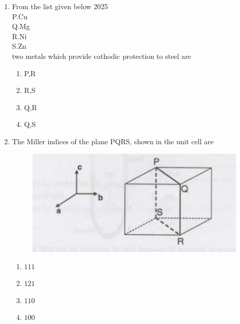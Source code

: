 \documentclass[journal]{IEEEtran}
\theoremstyle{remark}
\begin{document}
\begin{enumerate}
\begin{figure}[h]
    \label{fig:placeholder}
\end{figure}
\begin{multicols}{4}
\begin{enumerate}
    \item M1
    \item M2
    \item M3
    \item M4
\end{enumerate}
\end{multicols}
\item From the list given below 2025\\
P.Cu\\
Q.Mg\\
R.Ni\\
S.Zn\\
two metals which provide cathodic protection to steel are\hfill{}
\begin{multicols}{4}
\begin{enumerate}
    \item P,R
    \item R,S
    \item Q,R
    \item Q,S
\end{enumerate}
    
\end{multicols}


\item The Miller indices of the plane PQRS, shown in the unit cell are\hfill{}
\begin{figure}[h]
    \centering
    \includegraphics[width=0.5\linewidth]{IMAGES/Q.14.png}
    \label{fig:placeholder}
\end{figure}
\begin{multicols}{4}
\begin{enumerate}
\item $111$
\item$121$
\item $110$
\item $100$
\end{enumerate}
\end{multicols}


\end{enumerate}
\end{document}
